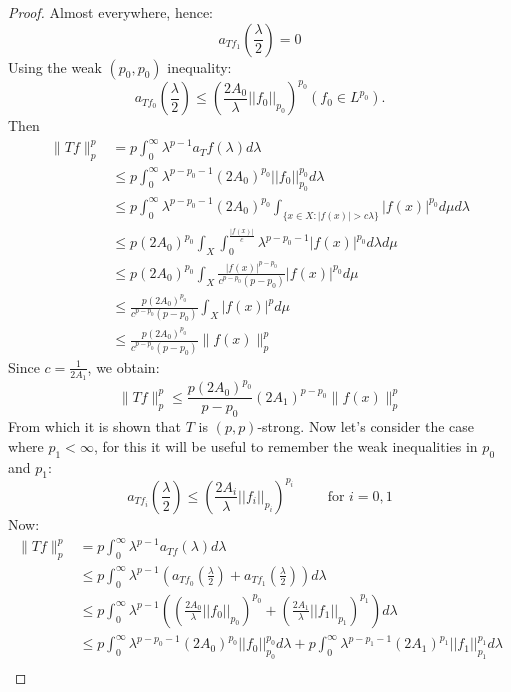 \begin{proof}
  Almost everywhere, hence:
  $$a_{Tf_1}(\frac{\lambda}{2}) = 0$$
  Using the weak $\left(p_0, p_0\right)$ inequality: \\
  $$a_{Tf_0}\left(\frac{\lambda}{2}\right) \leq \left(\frac{2 A_0}{\lambda} ||f_0||_{p_0}\right)^{p_0} \left(f_0 \in L^{p_0}\right).$$ Then
  \begin{align*}
    \|T f\|_p^p & = p \int_0^{\infty} \lambda^{p - 1} a_Tf(\lambda) d\lambda\\
    & \leq p \int_0^{\infty} \lambda^{p - p_0 - 1} \left(2 A_0\right)^{p_0} ||f_0||_{p_0}^{p_0} d\lambda \\
    & \leq p \int_0^{\infty} \lambda^{p - p_0 - 1} \left(2 A_0\right)^{p_0} \int_{\{x \in X: |f(x)| > c\lambda\}} |f(x)|^{p_0} d\mu d\lambda \\
    & \leq p \left(2 A_0\right)^{p_0} \int_X \int_0^{\frac{|f(x)|}{c}} \lambda^{p - p_0 - 1}|f(x)|^{p_0} d\lambda d\mu \\
    & \leq p \left(2 A_0\right)^{p_0} \int_X \frac{|f(x)|^{p - p_0}}{c^{p - p_0}(p - p_0)} |f(x)|^{p_0} d\mu \\
    & \leq \frac{p(2A_0)^{p_0}}{c^{p - p_0}(p - p_0)} \int_X |f(x)|^p d\mu\\
    & \leq \frac{p(2A_0)^{p_0}}{c^{p - p_0}(p - p_0)} \|f(x)\|_p^p
  \end{align*}
  Since $c = \frac{1}{2A_1}$, we obtain:
  $$\|Tf\|_p^p \leq \frac{p(2A_0)^{p_0}}{p - p_0}(2A_1)^{p - p_0}\|f(x)\|_p^p$$
  From which it is shown that $T$ is $(p,p)$-strong.
  \newpage
  Now let's consider the case where $p_1 < \infty$, for this it will be useful to remember the weak inequalities in $p_0$ and $p_1$:
  $$a_{Tf_i}\left(\frac{\lambda}{2}\right) \leq \left( \frac{2A_i}{\lambda} ||f_i||_{p_i}\right)^{p_i} \hspace{1cm}\text{for } i=0,1$$
  Now:
  \begin{align*}
    \|Tf\|_p^p & = p \int_0^\infty \lambda^{p - 1} a_{Tf}(\lambda) d\lambda\\
    & \leq p \int_0^\infty \lambda^{p - 1} \left(a_{Tf_0}\left(\frac{\lambda}{2}\right) + a_{Tf_1}\left(\frac{\lambda}{2}\right)\right) d\lambda\\
    & \leq p \int_0^\infty \lambda^{p - 1} \left(\left( \frac{2A_0}{\lambda} ||f_0||_{p_0}\right)^{p_0} + \left( \frac{2A_1}{\lambda} ||f_1||_{p_1}\right)^{p_1}\right) d\lambda\\
    & \leq p \int_0^\infty \lambda^{p - p_0 - 1} (2A_0)^{p_0} ||f_0||_{p_0}^{p_0} d\lambda + p \int_0^\infty \lambda^{p - p_1 - 1} (2A_1)^{p_1} ||f_1||_{p_1}^{p_1} d\lambda\\

\end{align*}
\end{proof}
